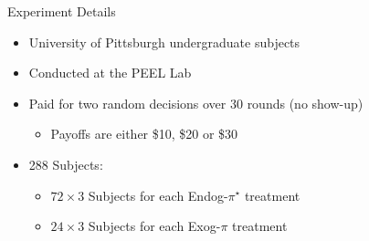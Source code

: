 \documentclass{beamer}
\begin{document}
\begin{frame}{Experiment Details}
    \begin{itemize}
        \item University of Pittsburgh undergraduate subjects
        \item Conducted at the PEEL Lab
        \item Paid for two random decisions over 30 rounds (no show-up)
            \begin{itemize}
                \item Payoffs are either \$10, \$20 or \$30
            \end{itemize}
        \item 288 Subjects:
            \begin{itemize}
                \item $72\times3$ Subjects for each Endog-$\pi^{\star}$ treatment
                \item $24\times3$ Subjects for each Exog-$\pi$ treatment
            \end{itemize}
    \end{itemize}
\end{frame}

\end{document}
